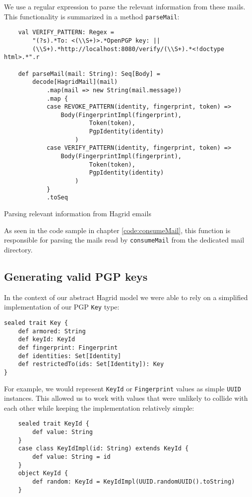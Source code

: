 We use a regular expression to parse the relevant information from these mails. This functionality is summarized in a method \texttt{parseMail}:
\begin{code}
    \begin{verbatim}
    val VERIFY_PATTERN: Regex = 
        "(?s).*To: <(\\S+)>.*OpenPGP key: ||
        (\\S+).*http://localhost:8080/verify/(\\S+).*<!doctype html>.*".r

    def parseMail(mail: String): Seq[Body] =
        decode[HagridMail](mail)
            .map(mail => new String(mail.message))
            .map {
            case REVOKE_PATTERN(identity, fingerprint, token) => 
                Body(FingerprintImpl(fingerprint), 
                        Token(token), 
                        PgpIdentity(identity)
                    )
            case VERIFY_PATTERN(identity, fingerprint, token) => 
                Body(FingerprintImpl(fingerprint), 
                        Token(token), 
                        PgpIdentity(identity)
                    )
            }
            .toSeq
    \end{verbatim}
    \caption{Parsing relevant information from Hagrid emails}
\end{code}

As seen in the code sample in chapter \ref{code:consumeMail}, this function is responsible for parsing the mails read by \texttt{consumeMail} from the dedicated mail directory.

\subsection{Generating valid PGP keys}
In the context of our abstract Hagrid model we were able to rely on a simplified implementation of our PGP \texttt{Key} type: 
\begin{verbatim}
sealed trait Key {
    def armored: String
    def keyId: KeyId
    def fingerprint: Fingerprint
    def identities: Set[Identity]
    def restrictedTo(ids: Set[Identity]): Key
}
\end{verbatim} 
For example, we would represent \texttt{KeyId} or \texttt{Fingerprint} values as simple \texttt{UUID} instances. This allowed us to work with values that were unlikely to collide with each other while keeping the implementation relatively simple:
\begin{verbatim}
    sealed trait KeyId {
        def value: String
    }
    case class KeyIdImpl(id: String) extends KeyId {
        def value: String = id
    }
    object KeyId {
        def random: KeyId = KeyIdImpl(UUID.randomUUID().toString)
    }
\end{verbatim}

